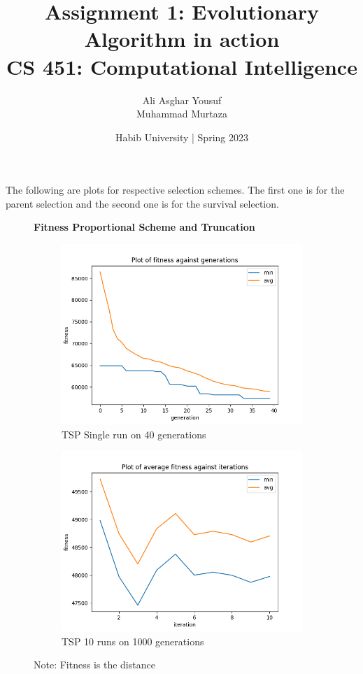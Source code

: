\documentclass[a4paper]{exam}
\title{Assignment 1: Evolutionary Algorithm in action\\CS 451: Computational Intelligence}
\author{Ali Asghar Yousuf\\Muhammad Murtaza}  %
\date{Habib University | Spring 2023}
\begin{document}
\maketitle

\begin{questions}

  The following are plots for respective selection schemes. The first one is for the parent selection
  and the second one is for the survival selection.

  \begin{figure}[H]
    \centering
    \textbf{Fitness Proportional Scheme and Truncation}
    \begin{subfigure}{.5\textwidth}
      \centering
      \includegraphics[width=1\linewidth]{images/tsp_fps_tn_gen.png}
      \caption{TSP Single run on 40 generations}
      \label{fig:tsp_fps_tn_sub1}
    \end{subfigure}%
    \begin{subfigure}{.5\textwidth}
      \centering
      \includegraphics[width=1\linewidth]{images/tsp_fps_tn_itr.png}
      \caption{TSP 10 runs on 1000 generations}
      \label{fig:tsp_fps_tn_sub2}
    \end{subfigure}
    \caption{Note: Fitness is the distance}
    \label{fig:tsp_fps_tn}
  \end{figure}


\end{questions}
\end{document}
